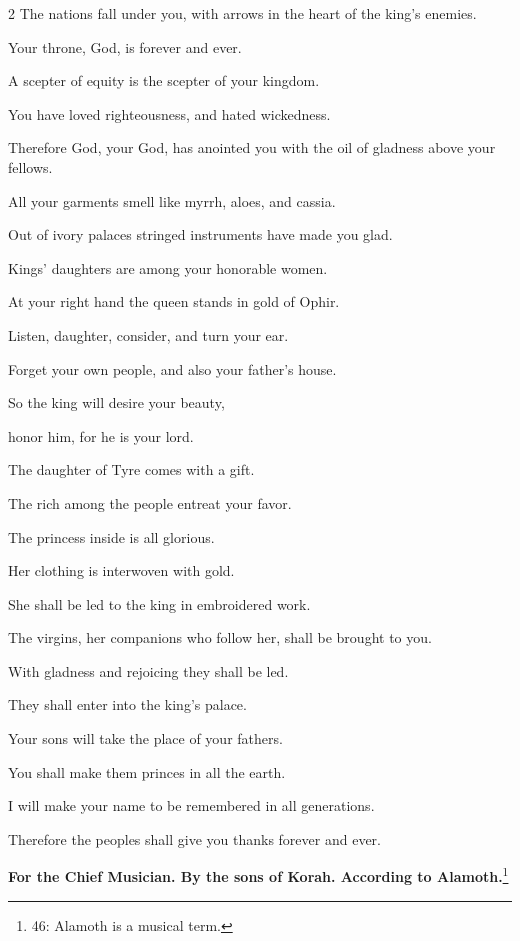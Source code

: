 \begin{multicols}{2}
	The nations fall under you, with arrows in the heart of the king’s enemies.
	
	
	\myverse{}Your throne, God, is forever and ever.
	
	A scepter of equity is the scepter of your kingdom.
	
	
	\myverse{}You have loved righteousness, and hated wickedness.
	
	Therefore God, your God, has anointed you with the oil of gladness above your
	fellows.
	
	
	\myverse{}All your garments smell like myrrh, aloes, and cassia.
	
	Out of ivory palaces stringed instruments have made you glad.
	
	
	\myverse{}Kings’ daughters are among your honorable women.
	
	At your right hand the queen stands in gold of Ophir.
	
	
	\myverse{}Listen, daughter, consider, and turn your ear.
	
	Forget your own people, and also your father’s house.
	
	
	\myverse{}So the king will desire your beauty,
	
	honor him, for he is your lord.
	
	
	\myverse{}The daughter of Tyre comes with a gift.
	
	The rich among the people entreat your favor.
	
	
	\myverse{}The princess inside is all glorious.
	
	Her clothing is interwoven with gold.
	
	
	\myverse{}She shall be led to the king in embroidered work.
	
	The virgins, her companions who follow her, shall be brought to you.
	
	
	\myverse{}With gladness and rejoicing they shall be led.
	
	They shall enter into the king’s palace.
	
	
	\myverse{}Your sons will take the place of your fathers.
	
	You shall make them princes in all the earth.
	
	
	\myverse{}I will make your name to be remembered in all generations.
	
	Therefore the peoples shall give you thanks forever and ever.
	
	
	\mychapter{}\textbf{For the Chief Musician. By the sons of Korah. According to Alamoth.}\footnote{46: Alamoth is a musical term.}
	

\end{multicols}
